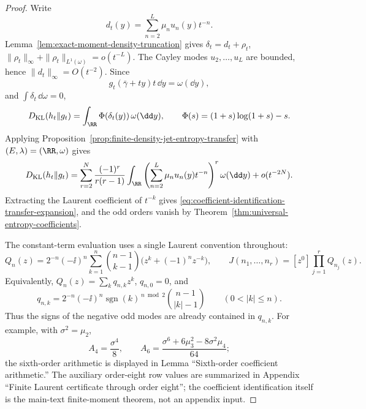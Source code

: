 \begin{proof}
Write
\[
d_t(y)=\sum_{n=2}^{L}\mu_nu_n(y)t^{-n}.
\]
Lemma~\ref{lem:exact-moment-density-truncation} gives
\(\delta_t=d_t+\rho_t\),
\(\|\rho_t\|_\infty+\|\rho_t\|_{L^1(\omega)}=o(t^{-L})\).  The Cayley modes
\(u_2,\ldots,u_L\) are bounded, hence \(\|d_t\|_\infty=O(t^{-2})\).  Since
\[
g_t(\bar{\gamma}+ty)t\,\dd y=\omega(\dd y),
\]
and \(\int\delta_t\,\dd\omega=0\),
\[
D_{\mathrm{KL}}(h_t\|g_t)
=\int_{\RR}\Phi(\delta_t(y))\,\omega(\dd y),
\qquad
\Phi(s)=(1+s)\log(1+s)-s .
\]
Applying
Proposition~\ref{prop:finite-density-jet-entropy-transfer} with
\((E,\lambda)=(\RR,\omega)\) gives
\[
D_{\mathrm{KL}}(h_t\|g_t)
=
\sum_{r=2}^{N}\frac{(-1)^r}{r(r-1)}
\int_{\RR}\left(\sum_{n=2}^{L}\mu_nu_n(y)t^{-n}\right)^r\omega(\dd y)
+o(t^{-2N}).
\]
Extracting the Laurent coefficient of \(t^{-k}\) gives
\eqref{eq:coefficient-identification-transfer-expansion}, and the odd
orders vanish by Theorem~\ref{thm:universal-entropy-coefficients}.

The constant-term evaluation uses a single Laurent convention throughout:
\[
Q_n(z)=2^{-n}(-\ii)^n
\sum_{k=1}^{n}\binom{n-1}{k-1}
\bigl(z^k+(-1)^nz^{-k}\bigr),
\qquad
J(n_1,\ldots,n_r)=[z^0]\prod_{j=1}^r Q_{n_j}(z).
\]
Equivalently, \(Q_n(z)=\sum_kq_{n,k}z^k\), \(q_{n,0}=0\), and
\[
q_{n,k}=2^{-n}(-\ii)^n
\operatorname{sgn}(k)^{\,n\bmod2}
\binom{n-1}{|k|-1}\qquad(0<|k|\le n).
\]
Thus the signs of the negative odd modes are already contained in
\(q_{n,k}\).  For example, with \(\sigma^2=\mu_2\),
\[
A_4=\frac{\sigma^4}{8},\qquad
A_6=\frac{\sigma^6+6\mu_3^2-8\sigma^2\mu_4}{64};
\]
  the sixth-order arithmetic is displayed in Lemma ``Sixth-order coefficient
  arithmetic.''  The auxiliary order-eight row values are summarized in
  Appendix ``Finite Laurent certificate through order
  eight''; the coefficient
identification itself is the main-text finite-moment theorem, not an appendix
input.
\end{proof}

